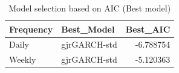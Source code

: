 \begin{table}[!h]
\centering
\caption{\label{tab:tab:aic_best}Model selection based on AIC (Best model)}
\centering
\begin{tabular}[t]{llr}
\toprule
Frequency & Best\_Model & Best\_AIC\\
\midrule
Daily & gjrGARCH-std & -6.788754\\
Weekly & gjrGARCH-std & -5.120363\\
\bottomrule
\end{tabular}
\end{table}
